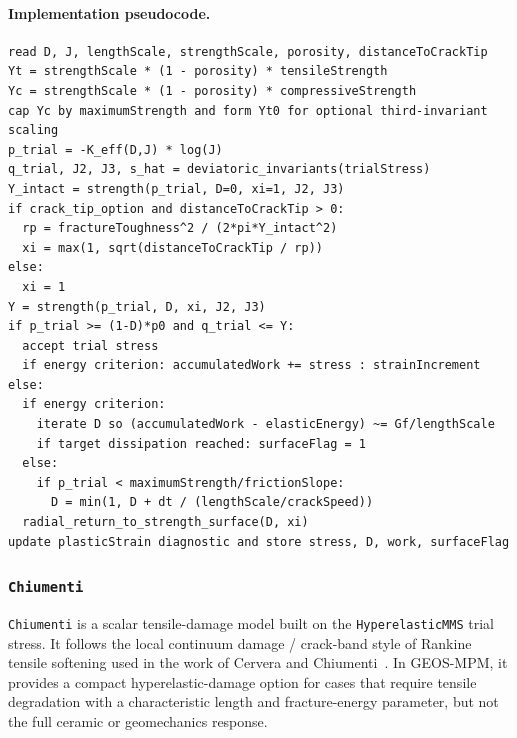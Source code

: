 \clearpage
\paragraph{Implementation pseudocode.}\mbox{}\par\smallskip
\begin{lstlisting}[caption={CeramicDamage update structure.},label={alg:ceramic-damage-update},basicstyle=\ttfamily\small]
read D, J, lengthScale, strengthScale, porosity, distanceToCrackTip
Yt = strengthScale * (1 - porosity) * tensileStrength
Yc = strengthScale * (1 - porosity) * compressiveStrength
cap Yc by maximumStrength and form Yt0 for optional third-invariant scaling
p_trial = -K_eff(D,J) * log(J)
q_trial, J2, J3, s_hat = deviatoric_invariants(trialStress)
Y_intact = strength(p_trial, D=0, xi=1, J2, J3)
if crack_tip_option and distanceToCrackTip > 0:
  rp = fractureToughness^2 / (2*pi*Y_intact^2)
  xi = max(1, sqrt(distanceToCrackTip / rp))
else:
  xi = 1
Y = strength(p_trial, D, xi, J2, J3)
if p_trial >= (1-D)*p0 and q_trial <= Y:
  accept trial stress
  if energy criterion: accumulatedWork += stress : strainIncrement
else:
  if energy criterion:
    iterate D so (accumulatedWork - elasticEnergy) ~= Gf/lengthScale
    if target dissipation reached: surfaceFlag = 1
  else:
    if p_trial < maximumStrength/frictionSlope:
      D = min(1, D + dt / (lengthScale/crackSpeed))
  radial_return_to_strength_surface(D, xi)
update plasticStrain diagnostic and store stress, D, work, surfaceFlag
\end{lstlisting}

\subsubsection{\texttt{Chiumenti}}
\label{subsubsec:chiumenti-model}

\texttt{Chiumenti} is a scalar tensile-damage model built on the \texttt{HyperelasticMMS} trial stress.  It follows the local continuum damage / crack-band style of Rankine tensile softening used in the work of Cervera and Chiumenti~\cite{cervera2006chiumenti}.  In GEOS-MPM, it provides a compact hyperelastic-damage option for cases that require tensile degradation with a characteristic length and fracture-energy parameter, but not the full ceramic or geomechanics response.

